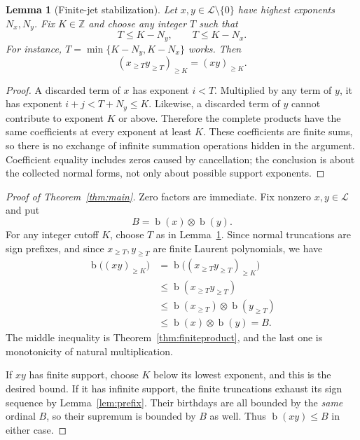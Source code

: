 \documentclass[11pt,letterpaper]{article}
\numberwithin{equation}{section}
\newtheorem{lemma}[theorem]{Lemma}
\theoremstyle{definition}
\theoremstyle{remark}
\newcommand{\Z}{\mathbb{Z}}
\newcommand{\Lau}{\mathcal{L}}
\newcommand{\bd}{\operatorname{b}}
\newcommand{\np}{\mathbin{\otimes}}
\begin{document}
\begin{lemma}[Finite-jet stabilization]\label{lem:jets}
Let $x,y\in\Lau\setminus\{0\}$ have highest exponents $N_x,N_y$.
Fix $K\in\Z$ and choose any integer $T$ such that
\begin{equation}\label{eq:T}
 T\leq K-N_y,\qquad T\leq K-N_x.
\end{equation}
For instance, $T=\min\{K-N_y,K-N_x\}$ works.
Then
\begin{equation}\label{eq:jet}
 (x_{\geq T}y_{\geq T})_{\geq K}=(xy)_{\geq K}.
\end{equation}
\end{lemma}
\begin{proof}
A discarded term of $x$ has exponent $i<T$. Multiplied by any term of $y$,
it has exponent $i+j<T+N_y\leq K$. Likewise, a discarded term of $y$ cannot
contribute to exponent $K$ or above. Therefore the complete products have the
same coefficients at every exponent at least $K$. These coefficients are
finite sums, so there is no exchange of infinite summation operations hidden
in the argument. Coefficient equality includes zeros caused by cancellation;
the conclusion is about the collected normal forms, not only about possible
support exponents.
\end{proof}

\begin{proof}[Proof of Theorem~\ref{thm:main}]
Zero factors are immediate. Fix nonzero $x,y\in\Lau$ and put
\[
 B=\bd(x)\np\bd(y).
\]
For any integer cutoff $K$, choose $T$ as in Lemma~\ref{lem:jets}. Since normal
truncations are sign prefixes, and since $x_{\geq T},y_{\geq T}$ are finite
Laurent polynomials, we have
\begin{align*}
 \bd\bigl((xy)_{\geq K}\bigr)
 &=\bd\bigl((x_{\geq T}y_{\geq T})_{\geq K}\bigr)\\
 &\leq\bd(x_{\geq T}y_{\geq T})\\
 &\leq\bd(x_{\geq T})\np\bd(y_{\geq T})\\
 &\leq\bd(x)\np\bd(y)=B.
\end{align*}
The middle inequality is Theorem~\ref{thm:finiteproduct}, and the last one is
monotonicity of natural multiplication.

If $xy$ has finite support, choose $K$ below its lowest exponent, and this is
the desired bound. If it has infinite support, the finite truncations exhaust
its sign sequence by Lemma~\ref{lem:prefix}. Their birthdays are all bounded
by the \emph{same} ordinal $B$, so their supremum is bounded by $B$ as well.
Thus $\bd(xy)\leq B$ in either case.
\end{proof}
\end{document}

